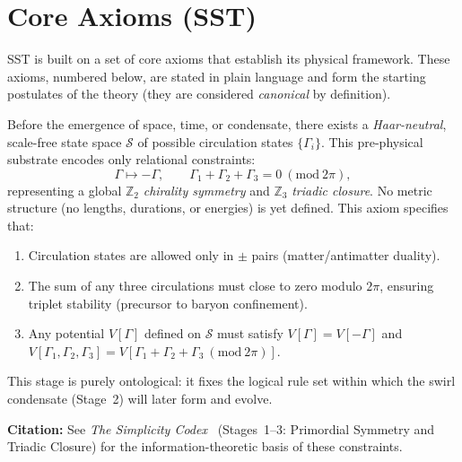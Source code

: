 \documentclass[reprint,aps,onecolumn,nofootinbib]{revtex4-2}
\begin{document}
	\section{Core Axioms (SST)}
	SST is built on a set of core axioms that establish its physical framework. These axioms, numbered below, are stated in plain language and form the starting postulates of the theory (they are considered \emph{canonical} by definition).
    \begin{tcolorbox}[title=Axiom 0: Logical Substrate (Pre-Swirl Potential)]
    Before the emergence of space, time, or condensate, there exists a
    \emph{Haar-neutral}, scale-free state space $\mathcal{S}$ of possible circulation states
    $\{\Gamma_i\}$. This pre-physical substrate encodes only relational constraints:
    \[
        \Gamma \mapsto -\Gamma,
        \qquad
        \Gamma_1 + \Gamma_2 + \Gamma_3 = 0 \ (\mathrm{mod}\ 2\pi),
    \]
    representing a global $\mathbb{Z}_2$ \emph{chirality symmetry} and
    $\mathbb{Z}_3$ \emph{triadic closure}.
    No metric structure (no lengths, durations, or energies) is yet defined.
    This axiom specifies that:
    \begin{enumerate}
    \item Circulation states are allowed only in $\pm$ pairs (matter/antimatter duality).
    \item The sum of any three circulations must close to zero modulo $2\pi$, ensuring
    triplet stability (precursor to baryon confinement).
    \item Any potential $V[\Gamma]$ defined on $\mathcal{S}$ must satisfy
    $V[\Gamma]=V[-\Gamma]$ and $V[\Gamma_1,\Gamma_2,\Gamma_3] =
    V[\Gamma_1+\Gamma_2+\Gamma_3\ (\mathrm{mod}\ 2\pi)]$.
    \end{enumerate}
    This stage is purely ontological: it fixes the logical rule set within which the
    swirl condensate (Stage~2) will later form and evolve.
    \end{tcolorbox}

    \noindent\textbf{Citation:}
    See \emph{The Simplicity Codex}~\cite{Goldau2025_STC} (Stages~1--3: Primordial Symmetry
    and Triadic Closure) for the information-theoretic basis of these constraints.
\end{document}
